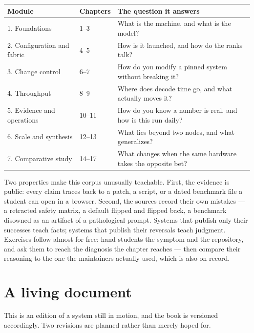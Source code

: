 \begin{center}\small
  \begin{tabular}{@{}ll>{\raggedright\arraybackslash}p{68mm}@{}}
    \toprule
    Module & Chapters & The question it answers \\
    \midrule
    1. Foundations & 1--3 & What is the machine, and what is the model? \\
    2. Configuration and fabric & 4--5 & How is it launched, and how do the ranks talk? \\
    3. Change control & 6--7 & How do you modify a pinned system without breaking it? \\
    4. Throughput & 8--9 & Where does decode time go, and what actually moves it? \\
    5. Evidence and operations & 10--11 & How do you know a number is real, and how is this run daily? \\
    6. Scale and synthesis & 12--13 & What lies beyond two nodes, and what generalizes? \\
    7. Comparative study & 14--17 & What changes when the same hardware takes the opposite bet? \\
    \bottomrule
  \end{tabular}
\end{center}

Two properties make this corpus unusually teachable. First, the evidence is
public: every claim traces back to a patch, a script, or a dated benchmark
file a student can open in a browser. Second, the sources record their own
mistakes --- a retracted safety matrix, a default flipped and flipped back, a
benchmark disowned as an artifact of a pathological prompt. Systems that
publish only their successes teach facts; systems that publish their
reversals teach judgment. Exercises follow almost for free: hand students the
symptom and the repository, and ask them to reach the diagnosis the chapter
reaches --- then compare their reasoning to the one the maintainers actually
used, which is also on record.

\section*{A living document}

This is an edition of a system still in motion, and the book is versioned
accordingly. Two revisions are planned rather than merely hoped for.

